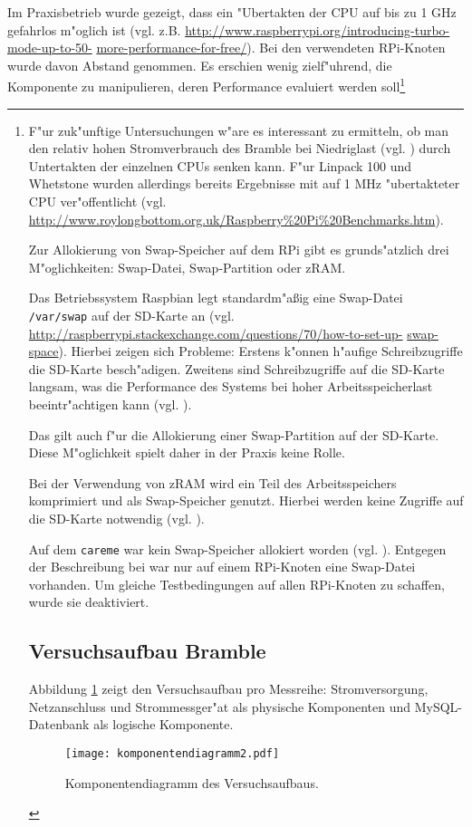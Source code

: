 Im Praxisbetrieb wurde gezeigt, dass ein "Ubertakten der CPU auf bis zu 1 GHz gefahrlos m"oglich ist (vgl. z.B. \url{http://www.raspberrypi.org/introducing-turbo-mode-up-to-50-} \url{more-performance-for-free/}). Bei den verwendeten RPi-Knoten wurde davon Abstand genommen. Es erschien wenig zielf"uhrend, die Komponente zu manipulieren, deren Performance evaluiert werden soll\footnote{F"ur zuk"unftige Untersuchungen w"are es interessant zu ermitteln, ob man den relativ hohen Stromverbrauch des Bramble bei Niedriglast (vgl. \cite{kli13}) durch Untertakten der einzelnen CPUs senken kann. F"ur Linpack 100 und Whetstone wurden allerdings bereits Ergebnisse mit auf 1 MHz "ubertakteter CPU ver"offentlicht (vgl. \url{http://www.roylongbottom.org.uk/Raspberry\%20Pi\%20Benchmarks.htm}).

Zur Allokierung von Swap-Speicher auf dem RPi gibt es grunds"atzlich drei M"oglichkeiten: Swap-Datei, Swap-Partition oder zRAM. 

\noindent
Das Betriebssystem Raspbian legt standardm"a\ss ig eine Swap-Datei \texttt{/var/swap} auf der SD-Karte an (vgl. \url{http://raspberrypi.stackexchange.com/questions/70/how-to-set-up-} \url{swap-space}). Hierbei zeigen sich Probleme: Erstens k"onnen h"aufige Schreibzugriffe die SD-Karte besch"adigen. Zweitens sind Schreibzugriffe auf die SD-Karte langsam, was die Performance des Systems bei hoher Arbeitsspeicherlast beeintr"achtigen kann (vgl. \cite{pow12}). 

Das gilt auch f"ur die Allokierung einer Swap-Partition auf der SD-Karte. Diese M"oglichkeit spielt daher in der Praxis keine Rolle. 

Bei der Verwendung von zRAM wird ein Teil des Arbeitsspeichers komprimiert und als Swap-Speicher genutzt. Hierbei werden keine Zugriffe auf die SD-Karte notwendig (vgl. \cite{pow12}). 

Auf dem \texttt{careme} war kein Swap-Speicher allokiert worden (vgl. \cite{kli13}). Entgegen der Beschreibung bei war nur auf einem RPi-Knoten eine Swap-Datei vorhanden. Um gleiche Testbedingungen auf allen RPi-Knoten zu schaffen, wurde sie deaktiviert. 

\subsection{Versuchsaufbau Bramble}\label{Bramble-Versuchsaufbau}

Abbildung \ref{fig:Komponentendiagramm} zeigt den Versuchsaufbau pro Messreihe: Stromversorgung, Netzanschluss und Strommessger"at als physische Komponenten und MySQL-Datenbank als logische Komponente. 
\begin{figure}[htb]
  \centering
  \centerline{\texttt{[image: komponentendiagramm2.pdf]}} 
  \caption{Komponentendiagramm des Versuchsaufbaus.}
  \label{fig:Komponentendiagramm}		
\end{figure}
}
